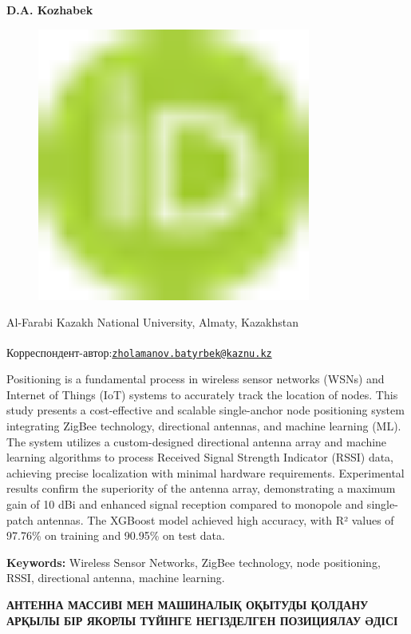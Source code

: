{\bfseries D.A.
Kozhabek}
\begin{figure}[H]
	\centering
	\includegraphics[width=0.8\textwidth]{media/ict/image16}
	\caption*{}
\end{figure}


Al-Farabi Kazakh National University, Almaty, Kazakhstan

{\bfseries \textsuperscript{\envelope }}Корреспондент-автор:\href{mailto:zholamanov.batyrbek@kaznu.kz}{\nolinkurl{zholamanov.batyrbek@kaznu.kz}}

Positioning is a fundamental process in wireless sensor networks (WSNs)
and Internet of Things (IoT) systems to accurately track the location of
nodes. This study presents a cost-effective and scalable single-anchor
node positioning system integrating ZigBee technology, directional
antennas, and machine learning (ML). The system utilizes a
custom-designed directional antenna array and machine learning
algorithms to process Received Signal Strength Indicator (RSSI) data,
achieving precise localization with minimal hardware requirements.
Experimental results confirm the superiority of the antenna array,
demonstrating a maximum gain of 10 dBi and enhanced signal reception
compared to monopole and single-patch antennas. The XGBoost model
achieved high accuracy, with R² values of 97.76\% on training and
90.95\% on test data.

{\bfseries Keywords:} Wireless Sensor Networks, ZigBee technology, node
positioning, RSSI, directional antenna, machine learning.

{\bfseries АНТЕННА МАССИВІ МЕН МАШИНАЛЫҚ ОҚЫТУДЫ ҚОЛДАНУ АРҚЫЛЫ БІР ЯКОРЛЫ
ТҮЙІНГЕ НЕГІЗДЕЛГЕН ПОЗИЦИЯЛАУ ӘДІСІ}

